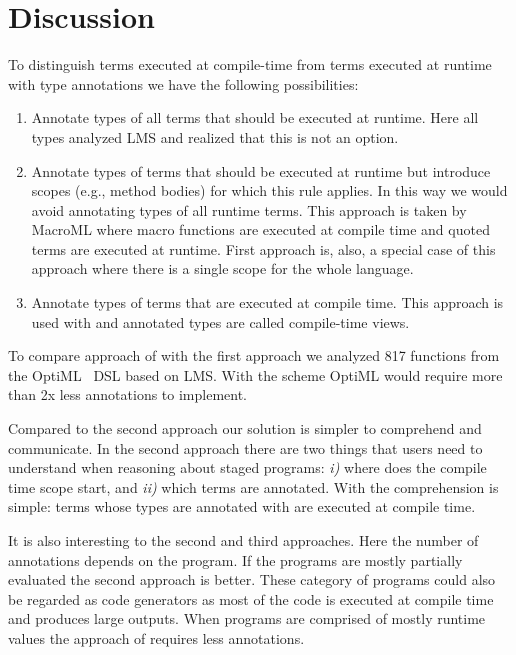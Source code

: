 \section{Discussion}
\label{sct:discussion}

To distinguish terms executed at compile-time from terms executed at runtime with type annotations we have the following possibilities:
\begin{enumerate}
\item Annotate types of all terms that should be executed at runtime. Here all types analyzed LMS and realized that this is not an option.

\item Annotate types of terms that should be executed at runtime but introduce scopes (e.g., method bodies) for which this rule applies.
In this way we would avoid annotating types of all runtime terms. This approach is taken by MacroML where
macro functions are executed at compile time and quoted terms are executed at runtime. First approach is, also,
a special case of this approach where there is a single scope for the whole language.

\item Annotate types of terms that are executed at compile time. This approach is used with \tool and annotated types are
called compile-time views.
\end{enumerate}

To compare approach of \tool with the first approach we analyzed 817 functions
from the OptiML~\cite{sujeeth_optiml:_2011} DSL based on LMS. With the \tool scheme
OptiML would require more than 2x less annotations to implement.

Compared to the second approach our solution is simpler to comprehend and communicate. In the second approach there are
two things that users need to understand when reasoning about staged programs: \emph{i)} where does
the compile time scope start, and \emph{ii)} which terms are annotated. With \tool the comprehension
is simple: terms whose types are annotated with  are executed at compile time.

It is also interesting to the second and third approaches. Here the number of annotations
depends on the program. If the programs are mostly partially evaluated the second approach
is better. These category of programs could also be regarded as code generators as most of the code
is executed at compile time and produces large outputs. When programs are comprised of mostly
runtime values the approach of \tool requires less annotations.



